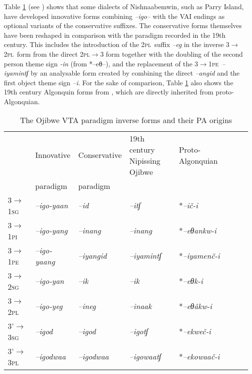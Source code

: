 \documentclass[twoside,a4paper,11pt]{article}
\newcommand{\ipa}[1]{{\phon\textit{#1}}}
\newcommand{\sg}{\textsc{sg}}
\newcommand{\pl}{\textsc{pl}}
\newcommand{\grise}[1]{\cellcolor{lightgray}\textbf{#1}}
\newcommand{\Σ}{\greek{Σ}}
\newcommand{\pli}{\textsc{pi}}
\newcommand{\pe}{\textsc{pe}}
\begin{document}
 Table \ref{tab:ojibwe.vta.2} (see \citealt[178-9]{valentine01grammar})  shows that some dialects of Nishnaabemwin,  such as Parry Island, have developed  innovative forms combining \ipa{--igo--} with the VAI endings as optional variants of the conservative suffixes. The conservative forms themselves have been reshaped in comparison with the paradigm recorded in the 19th century. This includes the introduction of the 2\pl\ suffix \ipa{--eg} in the inverse 3$\rightarrow$2\pl\ form from the direct 2\pl$\rightarrow$3 form together with the doubling of the second person theme sign \ipa{-in} (from *--eθ--), and the replacement of the 3$\rightarrow$1\pe\  \ipa{--iyamintʃ}  by an analysable form created by combining the direct \ipa{--angid} and the first object theme sign \ipa{--i}. For the sake of comparison,  Table \ref{tab:ojibwe.vta.2} also shows the 19th century Algonquin forms from \citet[51]{cuoq1866}, which are directly inherited from proto-Algonquian.

\begin{table}[H]
\caption{The Ojibwe VTA paradigm inverse forms and their PA origins}
\centering \label{tab:ojibwe.vta.2}
\begin{tabular}{llllllll}
\toprule
& Innovative & Conservative & 19th century Nipissing Ojibwe & Proto-Algonquian \\
&paradigm & paradigm&\\
\midrule
3$\rightarrow$1\sg &\ipa{--igo-yaan} \grise{}& 	\ipa{--id} & \ipa{--itʃ} &	 *\ipa{--ič-i} & 		\\
3$\rightarrow$1\pli & 	\ipa{--igo-yang} \grise{}& 	\ipa{--inang} &  	\ipa{--inang}  	 &*\ipa{--eθankw-i} & 		\\
3$\rightarrow$1\pe & 	\ipa{--igo-yaang} \grise{}& 	\ipa{--iyangid} \grise{}&	\ipa{--iyamintʃ}  &  *\ipa{--iyamenč-i} & 		\\
\midrule
3$\rightarrow$2\sg & 	\ipa{--igo-yan} \grise{}& 	\ipa{--ik} &	\ipa{--ik} &  *\ipa{--eθk-i} & 		\\
3$\rightarrow$2\pl & \ipa{--igo-yeg} \grise{}& 	\ipa{--ineg}  \grise{} & \ipa{--inaak}  & *\ipa{--eθâkw-i} & 		\\
\midrule
3'$\rightarrow$3\sg & \ipa{--igod} & 	\ipa{--igod} &		\ipa{--igotʃ} &*\ipa{--ekweč-i} & 		\\
3'$\rightarrow$3\pl & \ipa{--igodwaa}   & 	\ipa{--igodwaa}  \grise{}&\ipa{--igowaatʃ} &*\ipa{--ekowaač-i} & 		\\
\bottomrule
\end{tabular}
\end{table}
\end{document}
